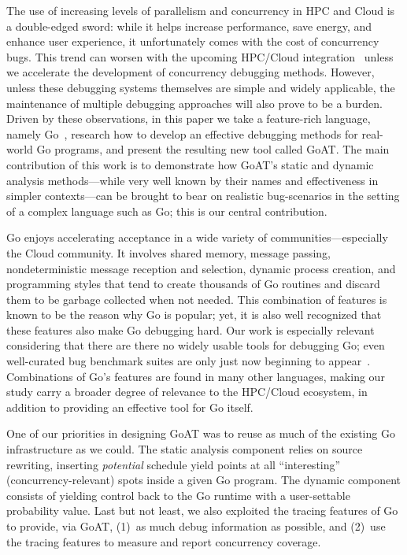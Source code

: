
The use of increasing levels of parallelism and concurrency in HPC and Cloud
is a double-edged sword: while it helps increase performance, save energy, and
enhance user experience, it
unfortunately comes with the cost of concurrency bugs.
%
This trend can worsen with the upcoming HPC/Cloud
integration~\cite{dan-herbein-dong} unless we accelerate the
development of concurrency debugging methods.
%
However, unless these debugging systems themselves are
simple and widely applicable,
the maintenance of multiple debugging approaches
will also prove to be a burden.
%
Driven by these observations,
in this paper we take a feature-rich language, namely Go~\cite{go-citation},
research how to develop an effective debugging methods for real-world
Go programs, and present the resulting new tool called GoAT.
%
The main contribution of this work is to demonstrate how
GoAT's static and dynamic analysis methods---while very well known
by their names and effectiveness in simpler contexts---can 
be brought to bear on realistic bug-scenarios in the setting of
a complex language such as Go; this is our central contribution.


Go enjoys accelerating acceptance in a wide variety of
communities---especially the Cloud community.
%
It involves shared memory, message passing, nondeterministic
message reception and selection,
dynamic process creation,
and programming styles that tend to create thousands of Go routines
and discard them to be garbage collected when not needed.
%
This combination of features is known to be the reason why Go
is popular; yet, it is also well recognized that these features also make
Go debugging hard.
%
Our work is especially relevant considering that
there are there no widely usable tools for debugging Go; even well-curated
bug benchmark suites are only just
now beginning to appear~\cite{tu-concurrentBugs-asplos19,yuan-gobench-cgo21}.
%
Combinations of Go's features are found in many other languages,
making our study carry a broader degree of relevance
to the HPC/Cloud ecosystem, in addition to providing an effective
tool for Go itself.


One of our priorities in designing GoAT
was to reuse as much of the existing Go infrastructure
as we could.
%
The static analysis component relies on source rewriting, inserting
{\em potential} schedule yield points
at all
``interesting'' (concurrency-relevant) spots inside a given Go program.
%
The dynamic component consists of yielding control back
to the Go runtime with a user-settable probability value.
%
Last but not least, we also exploited the tracing features of Go
to provide, via GoAT, (1)~as much debug information as possible, and
(2)~use the tracing features to measure and report concurrency coverage.


